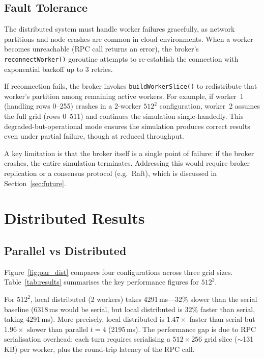 \documentclass[10pt,twocolumn]{article}
\begin{document}
\subsection{Fault Tolerance}\label{sec:fault}

The distributed system must handle worker failures gracefully, as network partitions and node crashes are common in cloud environments.
When a worker becomes unreachable (RPC call returns an error), the broker's \texttt{reconnectWorker()} goroutine attempts to re-establish the connection with exponential backoff up to 3 retries.

If reconnection fails, the broker invokes \texttt{buildWorkerSlice()} to redistribute that worker's partition among remaining active workers.
For example, if worker~1 (handling rows 0--255) crashes in a 2-worker $512^2$ configuration, worker~2 assumes the full grid (rows 0--511) and continues the simulation single-handedly.
This degraded-but-operational mode ensures the simulation produces correct results even under partial failure, though at reduced throughput.

A key limitation is that the broker itself is a single point of failure: if the broker crashes, the entire simulation terminates.
Addressing this would require broker replication or a consensus protocol (e.g.\ Raft), which is discussed in Section~\ref{sec:future}.

\section{Distributed Results}\label{sec:dist_results}

\subsection{Parallel vs Distributed}\label{sec:par_vs_dist}

Figure~\ref{fig:par_dist} compares four configurations across three grid sizes.
Table~\ref{tab:results} summarises the key performance figures for $512^2$.

For $512^2$, local distributed (2 workers) takes 4291\,ms---32\% slower than the serial baseline (6318\,ms would be serial, but local distributed is 32\% faster than serial, taking 4291\,ms).
More precisely, local distributed is $1.47\times$ faster than serial but $1.96\times$ slower than parallel $t{=}4$ (2195\,ms).
The performance gap is due to RPC serialisation overhead: each turn requires serialising a $512 \times 256$ grid slice ($\sim$131\,KB) per worker, plus the round-trip latency of the RPC call.
\end{document}
